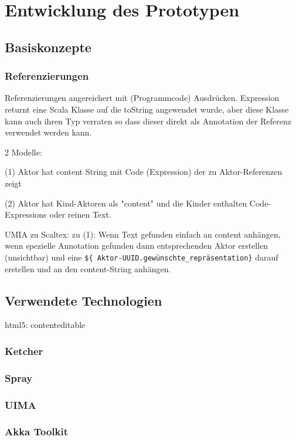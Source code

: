 \chapter{Entwicklung des Prototypen}


\section{Basiskonzepte}

\subsection{Referenzierungen}

Referenzierungen angereichert mit (Programmcode) Ausdrücken.
Expression returnt eine Scala Klasse auf die toString angewendet wurde,
aber diese Klasse kann auch ihren Typ verraten so dass dieser direkt
als Annotation der Referenz verwendet werden kann.

2 Modelle:

(1) Aktor hat content String mit Code (Expression) der zu Aktor-Referenzen zeigt

(2) Aktor hat Kind-Aktoren als "content" und die Kinder enthalten Code-Expressions
    oder reinen Text.

UMIA zu Scaltex:
zu (1): Wenn Text gefunden einfach an content anhängen, wenn spezielle
Annotation gefunden dann entsprechenden Aktor erstellen (unsichtbar) und
eine \verb|${ Aktor-UUID.gewünschte_repräsentation}| darauf erstellen und an
den content-String anhängen.


\section{Verwendete Technologien}

html5: contenteditable

\subsection{Ketcher}

\subsection{Spray}

\subsection{UIMA}

\subsection{Akka Toolkit}

